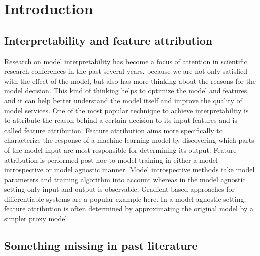 \chapter{Introduction}\label{ch:introduction}
\section{Interpretability and feature attribution}

Research on model interpretability has become a focus of attention in scientific research conferences in the past several years, because we are not only satisfied with the effect of the model, but also has more thinking about the reasons for the model decision. This kind of thinking helps to optimize the model and features, and it can help better understand the model itself and improve the quality of model services.
One of the most popular technique to achieve interpretability is to attribute the reason behind a certain decision to its input features and is called feature attribution. Feature attribution aims more specifically to characterize the response of a machine learning model by discovering which parts of the model input are most responsible for determining its output.  Feature attribution is performed post-hoc to model training in either a model introspective or model agnostic manner. Model introspective methods take model parameters and training algorithm into account whereas in the model agnostic setting only input and output is observable. Gradient based approaches for differentiable systems are a popular example here. In a model agnostic setting, feature attribution is often determined by approximating the original model by a simpler proxy model.

\section{Something missing in past literature}

